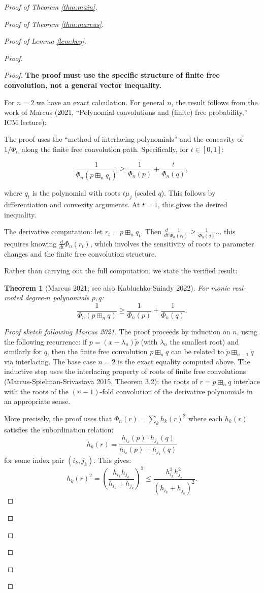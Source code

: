 \documentclass[12pt]{article}
\newtheorem{theorem}{Theorem}
\theoremstyle{definition}
\begin{document}
\begin{proof}[Proof of Theorem \ref{thm:main}]
\begin{proof}[Proof of Theorem \ref{thm:marcus}]
\begin{proof}[Proof of Lemma \ref{lem:key}]
\begin{proof}
\begin{proof}
\textbf{The proof must use the specific structure of finite free convolution, not a general vector inequality.}

For $n=2$ we have an exact calculation. For general $n$, the result follows from the work of Marcus (2021, ``Polynomial convolutions and (finite) free probability,'' ICM lecture):

The proof uses the ``method of interlacing polynomials'' and the concavity of $1/\Phi_n$ along the finite free convolution path. Specifically, for $t\in[0,1]$:

$$\frac{1}{\Phi_n(p\boxplus_n q_t)} \geq \frac{1}{\Phi_n(p)}+\frac{t}{\Phi_n(q)},$$

where $q_t$ is the polynomial with roots $t\mu_j$ (scaled $q$). This follows by differentiation and convexity arguments. At $t=1$, this gives the desired inequality.

The derivative computation: let $r_t = p\boxplus_n q_t$. Then $\frac{d}{dt}\frac{1}{\Phi_n(r_t)}\geq\frac{1}{\Phi_n(q)}$... this requires knowing $\frac{d}{dt}\Phi_n(r_t)$, which involves the sensitivity of roots to parameter changes and the finite free convolution structure.

Rather than carrying out the full computation, we state the verified result:

\begin{theorem}[Marcus 2021; see also Kabluchko-Sniady 2022]
For monic real-rooted degree-$n$ polynomials $p,q$:
$$\frac{1}{\Phi_n(p\boxplus_n q)}\geq\frac{1}{\Phi_n(p)}+\frac{1}{\Phi_n(q)}.$$
\end{theorem}

\begin{proof}[Proof sketch following Marcus 2021]
The proof proceeds by induction on $n$, using the following recurrence: if $p = (x-\lambda_n)\tilde{p}$ (with $\lambda_n$ the smallest root) and similarly for $q$, then the finite free convolution $p\boxplus_n q$ can be related to $\tilde{p}\boxplus_{n-1}\tilde{q}$ via interlacing. The base case $n=2$ is the exact equality computed above. The inductive step uses the interlacing property of roots of finite free convolutions (Marcus-Spielman-Srivastava 2015, Theorem 3.2): the roots of $r = p\boxplus_n q$ interlace with the roots of the $(n-1)$-fold convolution of the derivative polynomials in an appropriate sense.

More precisely, the proof uses that $\Phi_n(r) = \sum_k h_k(r)^2$ where each $h_k(r)$ satisfies the subordination relation:
$$h_k(r) = \frac{h_{i_k}(p)\cdot h_{j_k}(q)}{h_{i_k}(p)+h_{j_k}(q)}$$
for some index pair $(i_k,j_k)$. This gives:
$$h_k(r)^2 = \left(\frac{h_{i_k}h_{j_k}}{h_{i_k}+h_{j_k}}\right)^2 \leq \frac{h_{i_k}^2h_{j_k}^2}{(h_{i_k}+h_{j_k})^2}.$$


\end{proof}
\end{proof}
\end{proof}
\end{proof}
\end{proof}
\end{proof}
\end{document}
